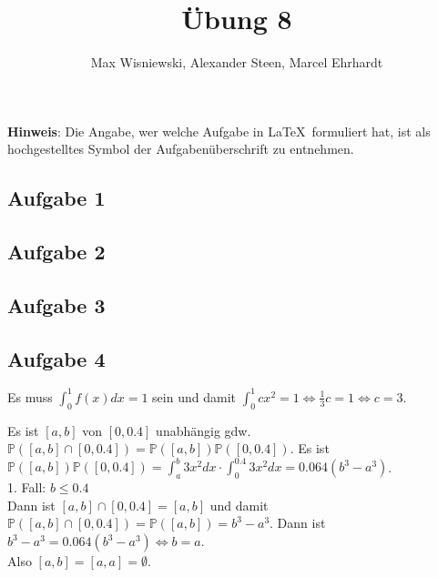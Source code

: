 \documentclass[11pt,a4paper,ngerman]{article}
\date{}
\title{Übung 8}
\author{Max Wisniewski\maxw, Alexander Steen\alex, Marcel Ehrhardt\marcel}
\newcommand{\Prob}{\mathbb{P}}
\begin{document}

\renewcommand{\figurename}{Figure}

\maketitle
\thispagestyle{fancy}

\begin{center}
\textbf{Hinweis}: Die Angabe, wer welche Aufgabe in \LaTeX\ formuliert hat, ist als hochgestelltes Symbol der Aufgabenüberschrift zu entnehmen.
\end{center}


\subsection*{Aufgabe 1}



\subsection*{Aufgabe 2}



\subsection*{Aufgabe 3}


\subsection*{Aufgabe 4}

Es muss $\int_0^1 f(x) dx = 1$ sein und damit $\int_0^1 c x^2 = 1 \Leftrightarrow \frac{1}{3}c = 1 \Leftrightarrow c = 3$.

Es ist $[a,b]$ von $[0,0.4]$ unabhängig gdw. $\Prob([a,b] \cap [0,0.4]) = \Prob([a,b]) \Prob([0,0.4])$.
Es ist $\Prob([a,b]) \Prob([0,0.4]) = \int_a^b 3x^2 dx \cdot \int_0^{0.4} 3x^2 dx = 0.064 (b^3 - a^3)$. \\

1. Fall: $b \leq 0.4$ \\
Dann ist $[a,b] \cap [0,0.4] = [a,b]$ und damit $\Prob([a,b] \cap [0,0.4]) = \Prob([a,b]) = b^3 - a^3$.
Dann ist $ b^3 - a^3 =  0.064 (b^3 - a^3) \Leftrightarrow b = a$. \\
Also $[a,b] = [a,a] = \emptyset$. \\
\end{document}
